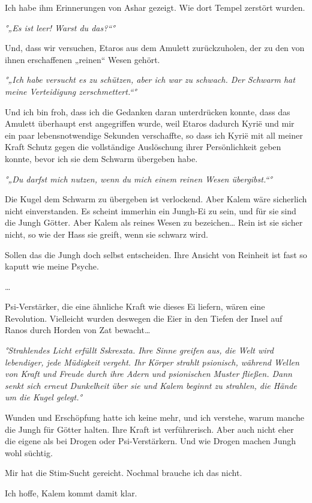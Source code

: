 \documentclass[11pt]{scrartcl}
\begin{document}
Ich habe ihm Erinnerungen von Ashar gezeigt. Wie dort Tempel zerstört
wurden.

\emph{°„Es ist leer! Warst du das?``°}

Und, dass wir versuchen, Etaros aus dem Amulett zurückzuholen, der zu
den von ihnen erschaffenen „reinen`` Wesen gehört.

\emph{°„Ich habe versucht es zu schützen, aber ich war zu schwach. Der
Schwarm hat meine Verteidigung zerschmettert.``°}

Und ich bin froh, dass ich die Gedanken daran unterdrücken konnte, dass
das Amulett überhaupt erst angegriffen wurde, weil Etaros dadurch Kyrië
und mir ein paar lebensnotwendige Sekunden verschaffte, so dass ich
Kyrië mit all meiner Kraft Schutz gegen die vollständige Auslöschung
ihrer Persönlichkeit geben konnte, bevor ich sie dem Schwarm übergeben
habe.

\emph{°„Du darfst mich nutzen, wenn du mich einem reinen Wesen
übergibst.``°}

Die Kugel dem Schwarm zu übergeben ist verlockend. Aber Kalem wäre
sicherlich nicht einverstanden. Es scheint immerhin ein Jungh-Ei zu
sein, und für sie sind die Jungh Götter. Aber Kalem als reines Wesen zu
bezeichen\ldots{} Rein ist sie sicher nicht, so wie der Hass sie greift,
wenn sie schwarz wird.

Sollen das die Jungh doch selbst entscheiden. Ihre Ansicht von Reinheit
ist fast so kaputt wie meine Psyche.

\ldots{}

Psi-Verstärker, die eine ähnliche Kraft wie dieses Ei liefern, wären
eine Revolution. Vielleicht wurden deswegen die Eier in den Tiefen der
Insel auf Ranos durch Horden von Zat bewacht\ldots{}

\emph{°Strahlendes Licht erfüllt Sskreszta. Ihre Sinne greifen aus, die
Welt wird lebendiger, jede Müdigkeit vergeht. Ihr Körper strahlt
psionisch, während Wellen von Kraft und Freude durch ihre Adern und
psionischen Muster fließen. Dann senkt sich erneut Dunkelheit über sie
und Kalem beginnt zu strahlen, die Hände um die Kugel gelegt.°}

Wunden und Erschöpfung hatte ich keine mehr, und ich verstehe, warum
manche die Jungh für Götter halten. Ihre Kraft ist verführerisch. Aber
auch nicht eher die eigene als bei Drogen oder Psi-Verstärkern. Und wie
Drogen machen Jungh wohl süchtig.

Mir hat die Stim-Sucht gereicht. Nochmal brauche ich das nicht.

Ich hoffe, Kalem kommt damit klar.
\end{document}
